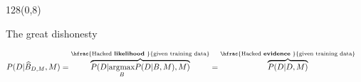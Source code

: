 \documentclass[shownotes]{beamer}
\begin{document}
\begin{frame}
 \begin{textblock}{128}(0,8)
\begin{center}
 \large The great dishonesty
\end{center}
\end{textblock}

\begin{mdframed}
\end{mdframed}

\vspace{0.6cm}

 \begin{equation*}
\begin{split}
P(D|\widehat{B}_{D,M},M) & = \overbrace{P(D|\underset{B}{\text{argmax}} P(D|B,M), M)}^{\hfrac{\text{\scriptsize Hacked \textbf{likelihood} }}{\text{\scriptsize  given training data}}} = \overbrace{P(D|D, M)}^{\hfrac{\text{\scriptsize Hacked \textbf{evidence} }}{\text{\scriptsize given training data}}}%
\end{split}
 \end{equation*}


 \pause
 \vspace{0.6cm}
 
 
 

\end{frame}
\end{document}
